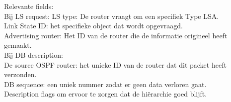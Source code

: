 Relevante fields:\\
Bij LS request: LS type: De router vraagt om een specifiek Type LSA.\\
Link State ID: het specifieke object dat wordt opgevraagd.\\
Advertising router: Het ID van de router die de informatie origineel heeft gemaakt.\\


Bij DB description:\\
De source OSPF router: het unieke ID van de router dat dit packet heeft verzonden.\\
DB sequence: een uniek nummer zodat er geen data verloren gaat. \\
Description flags om ervoor te zorgen dat de hiërarchie goed blijft.\\


